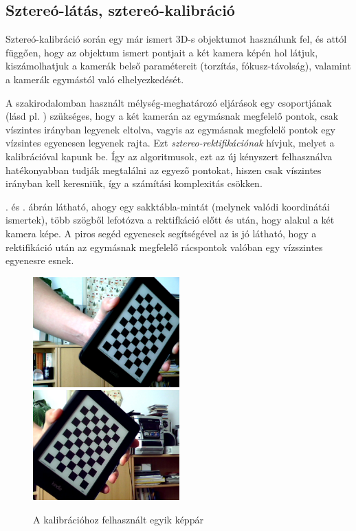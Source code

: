 \subsection{Sztereó-látás, sztereó-kalibráció}

Sztereó-kalibráció \cite{camera-calib-3d} során egy már ismert 3D-s objektumot használunk fel, és attól függően, hogy az objektum ismert pontjait a két kamera képén hol látjuk, kiszámolhatjuk a kamerák belső paramétereit (torzítás, fókusz-távolság), valamint a kamerák egymástól való elhelyezkedését. 

A szakirodalomban használt mélység-meghatározó eljárások egy csoportjának (lásd pl. \cite{SGBM, stereo-var}) szükséges, hogy a két kamerán az egymásnak megfelelő pontok, csak víszintes irányban legyenek eltolva, vagyis az egymásnak megfelelő pontok egy vízsintes egyenesen legyenek rajta. Ezt \textit{sztereo-rektifikációnak} hívjuk, melyet a kalibrációval kapunk be. Így az algoritmusok, ezt az új kényszert felhasználva hatékonyabban tudják megtalálni az egyező pontokat, hiszen csak víszintes irányban kell keresniük, így a számítási komplexitás csökken.

. és . ábrán látható, ahogy egy sakktábla-mintát (melynek valódi koordinátái ismertek), több szögből lefotózva a rektifkáció előtt és után, hogy alakul a két kamera képe. A piros segéd egyenesek segítségével az is jó látható, hogy a rektifikáció után az egymásnak megfelelő rácspontok valóban egy vízszintes egyenesre esnek.

\begin{figure}[tbh]
  \centering
  \includegraphics[width=160pt]{figures/left07.jpg}\hspace{10pt}
  \includegraphics[width=160pt]{figures/right07.jpg}
  \caption{A kalibrációhoz felhasznált egyik képpár   \label{fig:stereo-calibration-before}}
\end{figure}

